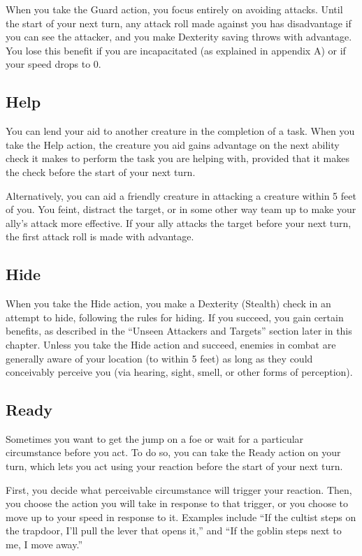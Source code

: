 When you take the Guard action, you focus entirely on avoiding attacks. Until the start of your next turn, any attack roll made against you has disadvantage if you can see the attacker, and you make Dexterity saving throws with advantage. You lose this benefit if you are incapacitated (as explained in appendix A) or if your speed drops to 0.

\subsection{Help}

You can lend your aid to another creature in the completion of a task. When you take the Help action, the creature you aid gains advantage on the next ability check it makes to perform the task you are helping with, provided that it makes the check before the start of your next turn.

Alternatively, you can aid a friendly creature in attacking a creature within 5 feet of you. You feint, distract the target, or in some other way team up to make your ally's attack more effective. If your ally attacks the target before your next turn, the first attack roll is made with advantage.

\subsection{Hide}

When you take the Hide action, you make a Dexterity (Stealth) check in an attempt to hide, following the rules for hiding. If you succeed, you gain certain benefits, as described in the “Unseen Attackers and Targets” section later in this chapter. Unless you take the Hide action and succeed, enemies in combat are generally aware of your location (to within 5 feet) as long as they could conceivably perceive you (via hearing, sight, smell, or other forms of perception).

\subsection{Ready}

Sometimes you want to get the jump on a foe or wait for a particular circumstance before you act. To do so, you can take the Ready action on your turn, which lets you act using your reaction before the start of your next turn.

First, you decide what perceivable circumstance will trigger your reaction. Then, you choose the action you will take in response to that trigger, or you choose to move up to your speed in response to it. Examples include “If the cultist steps on the trapdoor, I'll pull the lever that opens it,” and “If the goblin steps next to me, I move away.”

